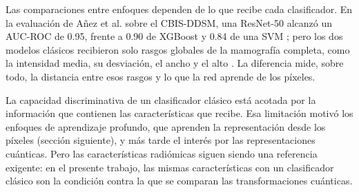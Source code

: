 Las comparaciones entre enfoques dependen de lo que recibe cada clasificador. En la evaluación de Añez et al. sobre el CBIS-DDSM, una ResNet-50 alcanzó un AUC-ROC de 0.95, frente a 0.90 de XGBoost y 0.84 de una SVM \cite{Anez2025AIPipeline}; pero los dos modelos clásicos recibieron solo rasgos globales de la mamografía completa, como la intensidad media, su desviación, el ancho y el alto \cite{Anez2025AIPipeline}. La diferencia mide, sobre todo, la distancia entre esos rasgos y lo que la red aprende de los píxeles.

La capacidad discriminativa de un clasificador clásico está acotada por la información que contienen las características que recibe. Esa limitación motivó los enfoques de aprendizaje profundo, que aprenden la representación desde los píxeles (sección siguiente), y más tarde el interés por las representaciones cuánticas. Pero las características radiómicas siguen siendo una referencia exigente: en el presente trabajo, las mismas características con un clasificador clásico son la condición contra la que se comparan las transformaciones cuánticas.
